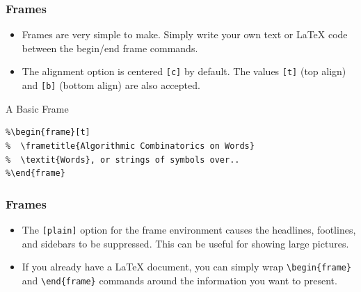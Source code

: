 \documentclass[aspectratio=169,utf8]{ctexbeamer}
\begin{document}
\begin{frame}[fragile]
  \frametitle{Frames}

  \begin{itemize}
    \setlength{\itemsep}{8pt}
    \item Frames are very simple to make. Simply write your own text or \LaTeX{} code between the begin/end frame commands.
    \item The alignment option is centered \texttt{[c]} by default. The values \texttt{[t]} (top align) and \texttt{[b]} (bottom align) are also accepted.
  \end{itemize}

  \begin{block}{A Basic Frame}
\begin{verbatim}
%\begin{frame}[t]
%  \frametitle{Algorithmic Combinatorics on Words}
%  \textit{Words}, or strings of symbols over..
%\end{frame}
\end{verbatim}
  \end{block}

\end{frame}


\begin{frame}[fragile]
  \frametitle{Frames}

  \begin{itemize}
    \setlength{\itemsep}{8pt}
    \item The \texttt{[plain]} option for the frame environment causes the headlines, footlines, and sidebars to be suppressed. This can be useful for showing large pictures.
    \item If you already have a \LaTeX{} document, you can simply wrap \verb|\begin{frame}| and \verb|\end{frame}| commands around the information you want to present.
  \end{itemize}
\end{frame}
\end{document}
